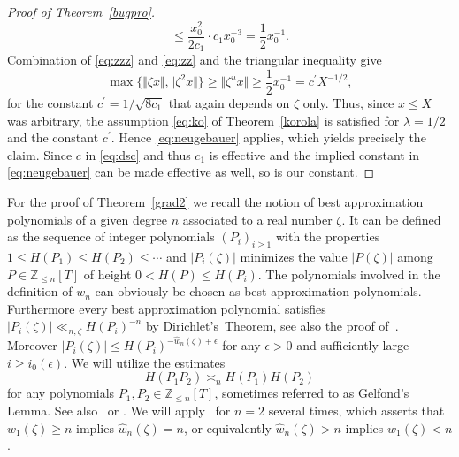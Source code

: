 \documentclass[12pt]{amsart}
\theoremstyle{definition}
\begin{document}
\begin{proof}[Proof of Theorem~\ref{bugpro}]
\begin{equation}
\leq \frac{x_{0}^{2}}{2c_{1}}\cdot c_{1} x_{0}^{-3}= \frac{1}{2}x_{0}^{-1}.
\end{equation}
%
Combination of \eqref{eq:zzz} and \eqref{eq:zz} and the triangular inequality give
%
\[
\max\{ \Vert \zeta x\Vert, \Vert\zeta^{2} x\Vert\} \geq \Vert \zeta^{u}x\Vert \geq \frac{1}{2}x_{0}^{-1}= c^{\prime} X^{-1/2},
\]
%
for the constant $c^{\prime}=1/\sqrt{8c_{1}}$ that again 
depends on $\zeta$ only. 
Thus, since $x\leq X$ was arbitrary, the assumption \eqref{eq:ko} of Theorem~\ref{korola} is satisfied for 
$\lambda=1/2$ and the constant $c^{\prime}$. Hence \eqref{eq:neugebauer} applies, which yields precisely the claim.
Since $c$ in \eqref{eq:dsc} and thus $c_{1}$
is effective
and the implied constant in \eqref{eq:neugebauer} can be
made effective as well, so is our constant.
\end{proof}

For the proof of Theorem~\ref{grad2} we recall the notion of best approximation polynomials of 
a given degree $n$ associated to a real number $\zeta$. 
It can be defined as the sequence of integer 
polynomials $(P_{i})_{i\geq 1}$ with the properties
$1\leq H(P_{1})\leq H(P_{2})\leq \cdots$ and $\vert P_{i}(\zeta)\vert$ 
minimizes the value $\vert P(\zeta)\vert$ among $P\in \mathbb{Z}_{\leq n}[T]$ 
of height $0<H(P)\leq H(P_{i})$.
The polynomials involved in the definition of $w_{n}$ can obviously be chosen as best approximation polynomials.
Furthermore every best approximation polynomial satisfies $\vert P_{i}(\zeta)\vert\ll_{n,\zeta} H(P_{i})^{-n}$ by Dirichlet's~Theorem,
see also the proof of~\cite[Lemma~8.1]{bugbuch}.
Moreover $\vert P_{i}(\zeta)\vert\leq H(P_{i})^{-\widehat{w}_{n}(\zeta)+\epsilon}$ for any $\epsilon>0$ and 
sufficiently large $i\geq i_{0}(\epsilon)$.
We will utilize the estimates
%
\begin{equation} \label{eq:hoehen}
H(P_{1}P_{2})\asymp_{n} H(P_{1})H(P_{2})
\end{equation}
%
for any polynomials $P_{1},P_{2}\in \mathbb{Z}_{\leq n}[T]$, 
sometimes referred to as Gelfond's Lemma. 
See also~\cite{wirsing} or \cite[Lemma~A.3]{bugbuch}.
We will apply~\cite[Theorem~5.1]{j3} for $n=2$ several times, which asserts
that $w_{1}(\zeta)\geq n$ implies $\widehat{w}_{n}(\zeta)=n$,
or equivalently $\widehat{w}_{n}(\zeta)>n$ implies $w_{1}(\zeta)<n$.
\end{document}
